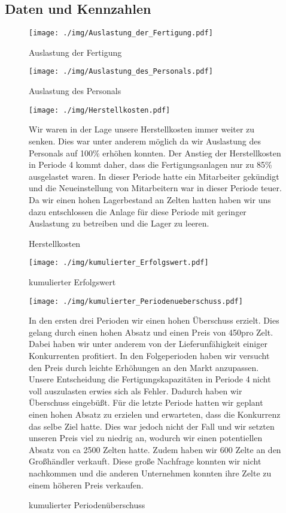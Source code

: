 \documentclass[a4paper, 12pt]{report}
\begin{document}
\begin{flushleft}
\chapter{Daten und Kennzahlen}
 
 \begin{figure}[th]
 \centering 
 \texttt{[image: ./img/Auslastung\_der\_Fertigung.pdf]}
 \caption[Auslastung der Fertigung]{Auslastung der Fertigung}
  \texttt{[image: ./img/Auslastung\_des\_Personals.pdf]}
  \caption[Auslastung des Personals]{Auslastung des Personals}  
\end{figure}

 
 \begin{figure}[th]
 \centering 
 \texttt{[image: ./img/Herstellkosten.pdf]}
  \caption[Herstellkosten]{Herstellkosten}
\begin{flushleft}
Wir waren in der Lage unsere Herstellkosten immer weiter zu senken. Dies war unter anderem möglich da wir Auslastung des Personals auf 100\% erhöhen konnten. 
Der Anstieg der Herstellkosten in Periode 4 kommt daher, dass die Fertigungsanlagen nur zu 85\% ausgelastet waren.
In dieser Periode hatte ein Mitarbeiter gekündigt und die Neueinstellung von Mitarbeitern war in dieser Periode teuer. Da wir einen hohen Lagerbestand an Zelten hatten haben wir uns dazu entschlossen die Anlage für diese Periode mit geringer Auslastung zu betreiben und die Lager zu leeren.
\end{flushleft}
\end{figure}




 \begin{figure}[b]
 \centering 
 \texttt{[image: ./img/kumulierter\_Erfolgswert.pdf]}
  \caption[kumulierter Erfolgswert]{kumulierter Erfolgswert}
\end{figure}
 
 \begin{figure}
 \centering 
 \texttt{[image: ./img/kumulierter\_Periodenueberschuss.pdf]}
  \caption[kumulierter Periodenüberschuss]
  {kumulierter Periodenüberschuss}
  \begin{flushleft}
 In den ersten drei Perioden wir einen hohen Überschuss erzielt.
Dies gelang durch einen hohen Absatz und einen Preis von 450\texteuro pro Zelt. 
Dabei haben wir unter anderem von der Lieferunfähigkeit einiger Konkurrenten profitiert.
In den Folgeperioden haben wir versucht den Preis durch leichte Erhöhungen an den Markt anzupassen. Unsere Entscheidung die Fertigungskapazitäten in Periode 4 nicht voll auszulasten erwies sich als Fehler. Dadurch haben wir Überschuss eingebüßt. 
Für die letzte Periode hatten wir geplant einen hohen Absatz zu erzielen und erwarteten, dass die Konkurrenz das selbe Ziel hatte. Dies war jedoch nicht der Fall und wir setzten unseren Preis viel zu niedrig an, wodurch wir einen potentiellen Absatz von ca 2500 Zelten hatte. Zudem haben wir 600 Zelte an den Großhändler verkauft. Diese große Nachfrage konnten wir nicht nachkommen und die anderen Unternehmen konnten ihre Zelte zu einem höheren Preis verkaufen.
  \end{flushleft}
\end{figure}


\end{flushleft}
\end{document}
